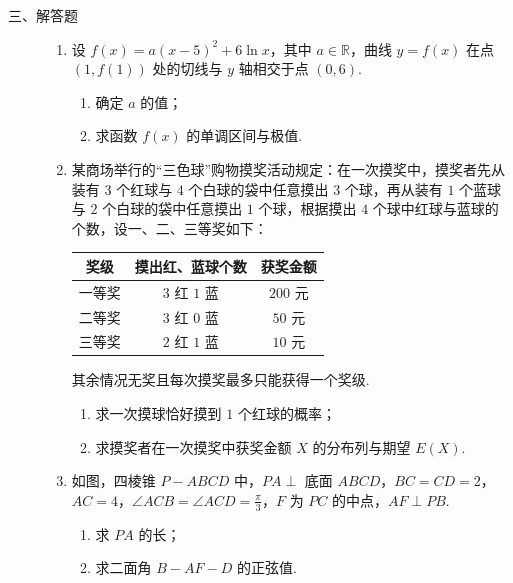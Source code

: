 \begin{description}

    \item[三、解答题]

    \begin{enumerate}[leftmargin=5pt]

      \addtocounter{enumi}{+16}

        \item 设 \( f(x) = a(x - 5)^2 + 6\ln x \)，其中 \( a \in \mathbb{R} \)，曲线 \( y = f(x) \) 在点 \((1, f(1))\) 处的切线与 \( y \) 轴相交于点 \((0, 6)\).
\begin{enumerate}
\item 确定 \(a\) 的值；
\item 求函数 \( f(x) \) 的单调区间与极值.
\end{enumerate}

        \item 某商场举行的“三色球”购物摸奖活动规定：在一次摸奖中，摸奖者先从装有 \(3\) 个红球与 \(4\) 个白球的袋中任意摸出 \(3\) 个球，再从装有 \(1\) 个蓝球与 \(2\) 个白球的袋中任意摸出 \(1\) 个球，根据摸出 \(4\) 个球中红球与蓝球的个数，设一、二、三等奖如下：

\begin{center}
\renewcommand{\arraystretch}{1.2}
\begin{tabular}{|c|c|c|}
\hline
奖级 & 摸出红、蓝球个数 & 获奖金额 \\
\hline
一等奖 & \(3\) 红 \(1\) 蓝 & \(200\text{ 元}\) \\
\hline
二等奖 & \(3\) 红 \(0\) 蓝 & \(50\text{ 元}\) \\
\hline
三等奖 & \(2\) 红 \(1\) 蓝 & \(10\text{ 元}\) \\
\hline
\end{tabular}
\end{center}

其余情况无奖且每次摸奖最多只能获得一个奖级.
\begin{enumerate}
\item 求一次摸球恰好摸到 \(1\) 个红球的概率；
\item 求摸奖者在一次摸奖中获奖金额 \(X\) 的分布列与期望 \( E(X) \).
\end{enumerate}

        \item 如图，四棱锥 \(P - ABCD\) 中，\(PA \perp\) 底面 \(ABCD\)，\(BC = CD = 2\)，\(AC = 4\)，\(\angle ACB = \angle ACD = \frac{\pi}{3}\)，\(F\) 为 \(PC\) 的中点，\(AF \perp PB\).

\begin{enumerate}
\item 求 \(PA\) 的长；
\item 求二面角 \(B - AF - D\) 的正弦值.
\end{enumerate}


\end{enumerate}
\end{description}
